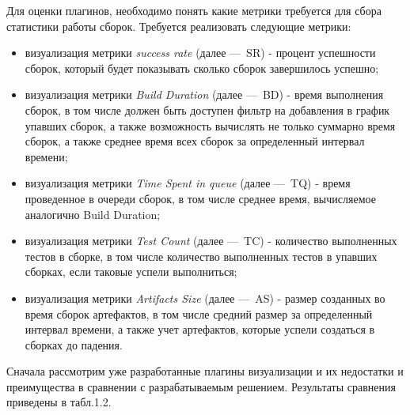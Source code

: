 Для оценки плагинов, необходимо понять какие метрики требуется для сбора статистики работы сборок. Требуется реализовать следующие метрики:

\begin{itemize}
	\item визуализация метрики \textit{success rate} (далее ---~SR) - процент успешности сборок, который будет показывать сколько сборок завершилось успешно;
	\item визуализация метрики  \textit{Build Duration} (далее ---~BD) - время выполнения сборок, в том числе должен быть доступен фильтр на добавления в график упавших сборок, а также возможность вычислять не только суммарно время сборок, а также среднее время всех сборок за определенный интервал времени;
	\item визуализация метрики  \textit{Time Spent in queue} (далее ---~TQ) - время проведенное в очереди сборок, в том числе среднее время, вычисляемое аналогично Build Duration;
	\item  визуализация метрики  \textit{Test Count} (далее ---~TC) - количество выполненных тестов в сборке, в том числе количество выполненных тестов в упавших сборках, если таковые успели выполниться;
	\item визуализация метрики  \textit{Artifacts Size} (далее ---~AS) - размер созданных во время сборок артефактов, в том числе средний размер за определенный интервал времени, а также учет артефактов, которые успели создаться в сборках до падения.
\end{itemize}

Сначала рассмотрим уже разработанные плагины визуализации и их недостатки и преимущества в сравнении с разрабатываемым решением. Результаты сравнения приведены в табл.1.2.

